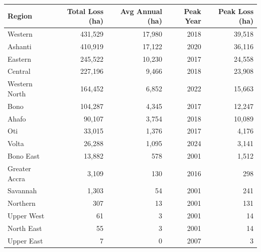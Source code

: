 \begin{tabular}{lrrrr}
\toprule
Region & Total Loss (ha) & Avg Annual (ha) & Peak Year & Peak Loss (ha) \\
\midrule
Western & 431,529 & 17,980 & 2018 & 39,518 \\
Ashanti & 410,919 & 17,122 & 2020 & 36,116 \\
Eastern & 245,522 & 10,230 & 2017 & 24,558 \\
Central & 227,196 & 9,466 & 2018 & 23,908 \\
Western North & 164,452 & 6,852 & 2022 & 15,663 \\
Bono & 104,287 & 4,345 & 2017 & 12,247 \\
Ahafo & 90,107 & 3,754 & 2018 & 10,089 \\
Oti & 33,015 & 1,376 & 2017 & 4,176 \\
Volta & 26,288 & 1,095 & 2024 & 3,141 \\
Bono East & 13,882 & 578 & 2001 & 1,512 \\
Greater Accra & 3,109 & 130 & 2016 & 298 \\
Savannah & 1,303 & 54 & 2001 & 241 \\
Northern & 307 & 13 & 2001 & 131 \\
Upper West & 61 & 3 & 2001 & 14 \\
North East & 55 & 3 & 2001 & 14 \\
Upper East & 7 & 0 & 2007 & 3 \\
\bottomrule
\end{tabular}
